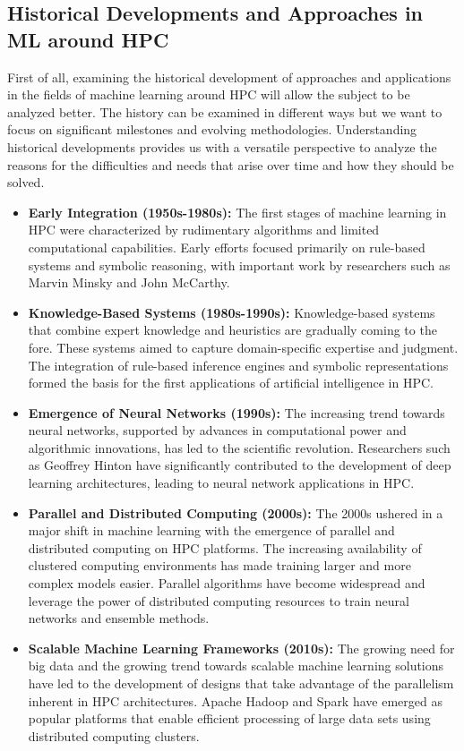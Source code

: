\documentclass[conference]{IEEEtran}
\begin{document}
\subsection{Historical Developments and Approaches in ML around HPC}\label{SCM}
First of all, examining the historical development of approaches and applications in the fields of machine learning around HPC will allow the subject to be analyzed better. The history can be examined in different ways but we want to focus on significant milestones and evolving methodologies\cite{b2}. Understanding historical developments provides us with a versatile perspective to analyze the reasons for the difficulties and needs that arise over time and how they should be solved.
\begin{itemize}
\item \textbf{Early Integration (1950s-1980s):} The first stages of machine learning in HPC were characterized by rudimentary algorithms and limited computational capabilities. Early efforts focused primarily on rule-based systems and symbolic reasoning, with important work by researchers such as Marvin Minsky and John McCarthy.
\item \textbf{Knowledge-Based Systems (1980s-1990s):} Knowledge-based systems that combine expert knowledge and heuristics are gradually coming to the fore. These systems aimed to capture domain-specific expertise and judgment. The integration of rule-based inference engines and symbolic representations formed the basis for the first applications of artificial intelligence in HPC.
\item \textbf{Emergence of Neural Networks (1990s):} The increasing trend towards neural networks, supported by advances in computational power and algorithmic innovations, has led to the scientific revolution. Researchers such as Geoffrey Hinton have significantly contributed to the development of deep learning architectures, leading to neural network applications in HPC.
\item \textbf{Parallel and Distributed Computing (2000s):} The 2000s ushered in a major shift in machine learning with the emergence of parallel and distributed computing on HPC platforms. The increasing availability of clustered computing environments has made training larger and more complex models easier. Parallel algorithms have become widespread and leverage the power of distributed computing resources to train neural networks and ensemble methods.
\item \textbf{Scalable Machine Learning Frameworks (2010s):} The growing need for big data and the growing trend towards scalable machine learning solutions have led to the development of designs that take advantage of the parallelism inherent in HPC architectures. Apache Hadoop and Spark have emerged as popular platforms that enable efficient processing of large data sets using distributed computing clusters.

\end{itemize}
\end{document}
